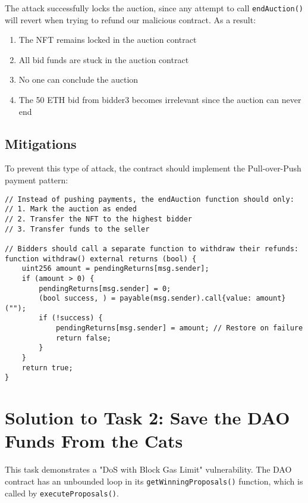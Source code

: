 \documentclass[12pt]{article}
\begin{document}
The attack successfully locks the auction, since any attempt to call \texttt{endAuction()} will revert when trying to refund our malicious contract. As a result:

\begin{enumerate}
\item The NFT remains locked in the auction contract
\item All bid funds are stuck in the auction contract
\item No one can conclude the auction
\item The 50 ETH bid from bidder3 becomes irrelevant since the auction can never end
\end{enumerate}

\subsection*{Mitigations}

To prevent this type of attack, the contract should implement the Pull-over-Push payment pattern:

\noindent
\begin{minipage}{\textwidth}
\begin{lstlisting}[language=Solidity]
// Instead of pushing payments, the endAuction function should only:
// 1. Mark the auction as ended
// 2. Transfer the NFT to the highest bidder
// 3. Transfer funds to the seller

// Bidders should call a separate function to withdraw their refunds:
function withdraw() external returns (bool) {
    uint256 amount = pendingReturns[msg.sender];
    if (amount > 0) {
        pendingReturns[msg.sender] = 0;
        (bool success, ) = payable(msg.sender).call{value: amount}("");
        if (!success) {
            pendingReturns[msg.sender] = amount; // Restore on failure
            return false;
        }
    }
    return true;
}
\end{lstlisting}
\end{minipage}

\section*{Solution to Task 2: Save the DAO Funds From the Cats}

This task demonstrates a "DoS with Block Gas Limit" vulnerability. The DAO contract has an unbounded loop in its \texttt{getWinningProposals()} function, which is called by \texttt{executeProposals()}.
\end{document}
